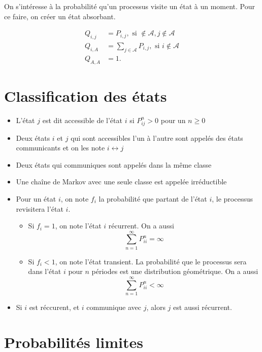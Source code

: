 On s'intéresse à la probabilité qu'un processus visite un état à un moment. Pour ce faire, on créer un état absorbant.  

\begin{align*}
Q_{i,j} &= P_{i,j}, \text{ si } \notin \mathcal{A}, j\notin \mathcal{A}\\
Q_{i,A} &= \sum_{j\in \mathcal{A}} P_{i,j}, \text{ si } i\notin \mathcal{A}\\
Q_{A, A} &= 1.
\end{align*}

\section{Classification des états}

\begin{itemize}
	\item L'état $j$ est dit accessible de l'état $i$ si $P_{ij}^n > 0$ pour un $n\geq 0$
	\item Deux états $i$ et $j$ qui sont accessibles l'un à l'autre sont appelés des états communicants et on les note $i\leftrightarrow j$
	\item Deux états qui communiques sont appelés dans la même classe
	\item Une chaîne de Markov avec une seule classe est appelée irréductible
	\item Pour un état $i$, on note $f_i$ la probabilité que partant de l'état $i$, le processus revisitera l'état $i$. 
	\begin{itemize}
		\item Si $f_i = 1$, on note l'état $i$ récurrent. On a aussi 
		$$\sum_{n = 1}^{\infty} P_{ii}^n = \infty$$
		\item Si $f_i < 1$, on note l'état transient. La probabilité que le processus sera dans l'état $i$ pour $n$ périodes est une distribution géométrique. On a aussi
		$$\sum_{n = 1}^{\infty} P_{ii}^n < \infty$$
	\end{itemize}
	\item Si $i$ est réccurent, et $i$ communique avec $j$, alors $j$ est aussi récurrent. 
\end{itemize}

\section{Probabilités limites}

